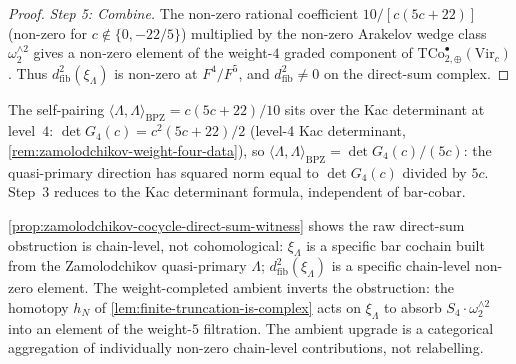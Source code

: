 \begin{proof}
\emph{Step 5: Combine.} The non-zero rational coefficient
\(10 / [c(5c+22)]\) (non-zero for \(c \notin \{0, -22/5\}\))
multiplied by the non-zero Arakelov wedge class
\(\omega_{2}^{\wedge 2}\) gives a non-zero element of the
weight-\(4\) graded component of
\(\mathrm{TCo}^{\bullet}_{2,\oplus}(\mathrm{Vir}_{c})\). Thus
\(d^{2}_{\mathrm{fib}}(\xi_{\Lambda})\) is non-zero at
\(F^{4}/F^{5}\), and \(d^{2}_{\mathrm{fib}} \ne 0\) on the
direct-sum complex.
\end{proof}

\begin{remark}
\label{rem:self-pairing-and-det-G4}
The self-pairing
\(\langle \Lambda, \Lambda \rangle_{\mathrm{BPZ}} = c(5c+22)/10\)
sits over the Kac determinant at level~\(4\):
\(\det G_{4}(c) = c^{2}(5c + 22)/2\) (level-4 Kac determinant,
\autoref{rem:zamolodchikov-weight-four-data}), so
\(\langle \Lambda, \Lambda\rangle_{\mathrm{BPZ}} = \det G_{4}(c)/(5c)\):
the quasi-primary direction has squared norm equal to
\(\det G_{4}(c)\) divided by \(5c\). Step~3 reduces to
the Kac determinant formula, independent of bar-cobar.
\end{remark}

\begin{remark}
\label{rem:why-not-cosmetic}
\autoref{prop:zamolodchikov-cocycle-direct-sum-witness} shows
the raw direct-sum obstruction is chain-level, not
cohomological: \(\xi_{\Lambda}\) is a specific bar cochain
built from the Zamolodchikov quasi-primary \(\Lambda\);
\(d^{2}_{\mathrm{fib}}(\xi_{\Lambda})\) is a specific chain-level
non-zero element. The weight-completed ambient inverts the
obstruction: the homotopy \(h_{N}\) of
\autoref{lem:finite-truncation-is-complex} acts on
\(\xi_{\Lambda}\) to absorb \(S_{4} \cdot \omega_{2}^{\wedge 2}\)
into an element of the weight-\(5\) filtration. The ambient
upgrade is a categorical aggregation of individually non-zero
chain-level contributions, not relabelling.
\end{remark}

